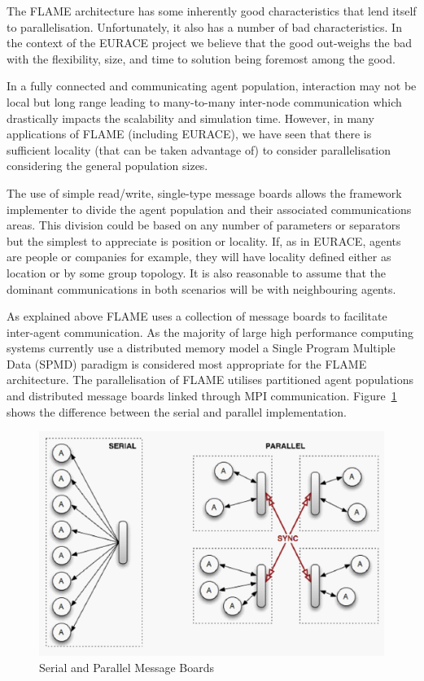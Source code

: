 The FLAME architecture has some inherently good characteristics that lend itself to parallelisation. Unfortunately, it also has a number of bad characteristics. In the context of the EURACE project we believe that the good out-weighs the bad with the flexibility, size, and time to solution being foremost among the good. 

In a fully connected and communicating agent population, interaction may not be local but long range leading to many-to-many inter-node communication which drastically impacts the scalability and simulation time. However, in many applications of FLAME (including EURACE), we have seen that there is sufficient locality (that can be taken advantage of) to consider parallelisation considering the general population sizes. 

The use of simple read/write, single-type message boards allows the framework implementer to divide the agent population and their associated communications areas. This division could be based on any number of parameters or separators but the simplest to appreciate is position or locality. If, as in EURACE, agents are people or companies for example, they will have locality defined either as location or by some group topology. It is also reasonable to assume that the dominant communications in both scenarios will be with neighbouring agents.

As explained above FLAME uses a collection of message boards to facilitate inter-agent communication. As the majority of large high performance computing systems currently use a distributed memory model a Single Program Multiple Data (SPMD) paradigm is considered most appropriate for the FLAME architecture. The parallelisation of FLAME utilises partitioned agent populations and distributed message boards linked through MPI communication. Figure~\ref{fig:Figure2} shows the difference between the serial and parallel implementation.

\begin{figure}[h]
	\centering
		\includegraphics[scale=0.25]{flame.jpg}
	\caption{Serial and Parallel Message Boards}
	\label{fig:Figure2}
\end{figure}

